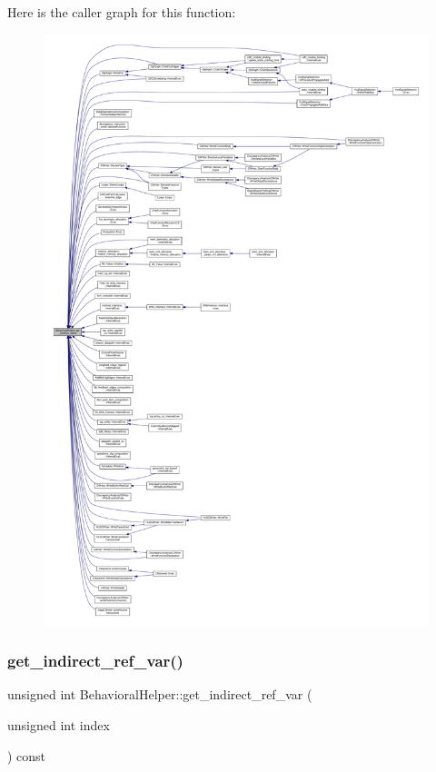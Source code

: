 Here is the caller graph for this function\+:
\nopagebreak
\begin{figure}[H]
\begin{center}
\leavevmode
\includegraphics[width=350pt]{dd/db2/classBehavioralHelper_a7e1ca094d7e2d5b3ec825cf3a73e5f8c_icgraph}
\end{center}
\end{figure}
\mbox{\label{classBehavioralHelper_a810664b0f87645d004da4848ef574974}} 
\subsubsection{\texorpdfstring{get\+\_\+indirect\+\_\+ref\+\_\+var()}{get\_indirect\_ref\_var()}}
{\footnotesize\ttfamily unsigned int Behavioral\+Helper\+::get\+\_\+indirect\+\_\+ref\+\_\+var (\begin{DoxyParamCaption}\item[{unsigned int}]{index }\end{DoxyParamCaption}) const\hspace{0.3cm}{\ttfamily [virtual]}}



